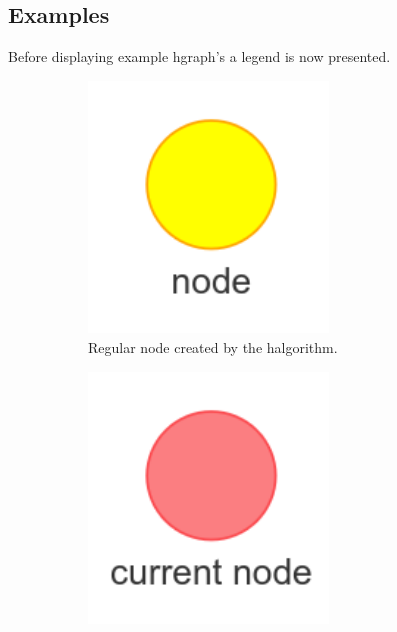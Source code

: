 \subsection{Examples}%
\label{subsec:hgraph_example}

Before displaying example \ac{hgraph}'s a legend is now presented.\bs

\begin{figure}[H]
    \centering
    \begin{subfigure}{0.2\textwidth}
    \centering
    \includegraphics[width=0.7\textwidth]{figures/connecting_nodes/legend/node}
    \caption{Regular node created by the \ac{halgorithm}.\newline}%
    \end{subfigure}
    \begin{subfigure}{0.2\textwidth}
    \centering
    \includegraphics[width=0.7\textwidth]{figures/connecting_nodes/legend/current_node}

\end{subfigure}
\end{figure}
